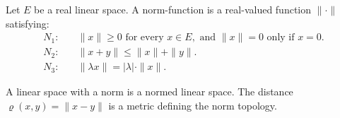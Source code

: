 Let $E$ be a real linear space. A norm-function is a real-valued function $\|\cdot\|$ satisfying:
\begin{align}
N_1:&\quad \|x\| \geq 0 \text{ for every } x \in E, \text{ and } \|x\| = 0 \text{ only if } x = 0. \\
N_2:&\quad \|x + y\| \leq \|x\| + \|y\|. \\
N_3:&\quad \|\lambda x\| = |\lambda| \cdot \|x\|.
\end{align}

A linear space with a norm is a normed linear space. The distance $\varrho(x, y) = \|x - y\|$ is a metric defining the norm topology.
